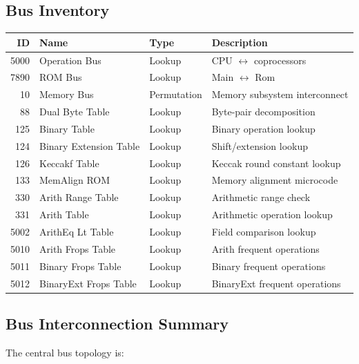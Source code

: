 \subsection{Bus Inventory}
\label{sec:bus-inventory}

\begin{center}
\renewcommand{\arraystretch}{1.3}
\begin{tabular}{@{}rlll@{}}
  \toprule
  ID & Name & Type & Description \\
  \midrule
  5000 & Operation Bus & Lookup & CPU $\leftrightarrow$ coprocessors \\
  7890 & ROM Bus & Lookup & Main $\leftrightarrow$ Rom \\
  10   & Memory Bus & Permutation & Memory subsystem interconnect \\
  88   & Dual Byte Table & Lookup & Byte-pair decomposition \\
  125  & Binary Table & Lookup & Binary operation lookup \\
  124  & Binary Extension Table & Lookup & Shift/extension lookup \\
  126  & Keccakf Table & Lookup & Keccak round constant lookup \\
  133  & MemAlign ROM & Lookup & Memory alignment microcode \\
  330  & Arith Range Table & Lookup & Arithmetic range check \\
  331  & Arith Table & Lookup & Arithmetic operation lookup \\
  5002 & ArithEq Lt Table & Lookup & Field comparison lookup \\
  5010 & Arith Frops Table & Lookup & Arith frequent operations \\
  5011 & Binary Frops Table & Lookup & Binary frequent operations \\
  5012 & BinaryExt Frops Table & Lookup & BinaryExt frequent operations \\
  \bottomrule
\end{tabular}
\end{center}

\subsection{Bus Interconnection Summary}
\label{sec:bus-diagram}

The central bus topology is:


